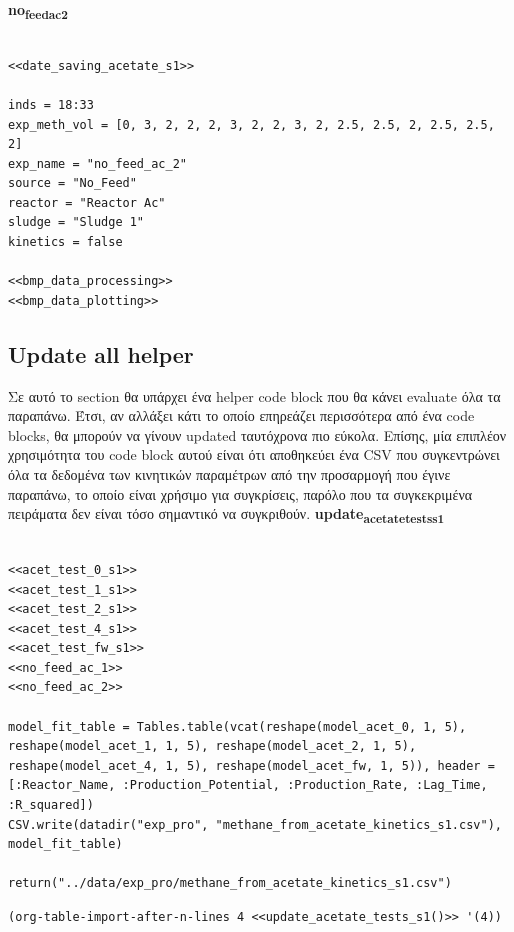 \documentclass[11pt]{article}
\begin{document}
\textbf{no\textsubscript{feed}\textsubscript{ac}\textsubscript{2}}
\begin{verbatim}

<<date_saving_acetate_s1>>

inds = 18:33
exp_meth_vol = [0, 3, 2, 2, 2, 3, 2, 2, 3, 2, 2.5, 2.5, 2, 2.5, 2.5, 2]
exp_name = "no_feed_ac_2"
source = "No_Feed"
reactor = "Reactor Ac"
sludge = "Sludge 1"
kinetics = false

<<bmp_data_processing>>
<<bmp_data_plotting>>
\end{verbatim}

\subsection{Update all helper}
\label{sec:orgf0967ed}
Σε αυτό το section θα υπάρχει ένα helper code block που θα κάνει evaluate όλα τα παραπάνω. Έτσι, αν αλλάξει κάτι το οποίο επηρεάζει περισσότερα από ένα code blocks, θα μπορούν να γίνουν updated ταυτόχρονα πιο εύκολα. Επίσης, μία επιπλέον χρησιμότητα του code block αυτού είναι ότι αποθηκεύει ένα CSV που συγκεντρώνει όλα τα δεδομένα των κινητικών παραμέτρων από την προσαρμογή που έγινε παραπάνω, το οποίο είναι χρήσιμο για συγκρίσεις, παρόλο που τα συγκεκριμένα πειράματα δεν είναι τόσο σημαντικό να συγκριθούν.
\textbf{update\textsubscript{acetate}\textsubscript{tests}\textsubscript{s1}}
\begin{verbatim}

<<acet_test_0_s1>>
<<acet_test_1_s1>>
<<acet_test_2_s1>>
<<acet_test_4_s1>>
<<acet_test_fw_s1>>
<<no_feed_ac_1>>
<<no_feed_ac_2>>

model_fit_table = Tables.table(vcat(reshape(model_acet_0, 1, 5), reshape(model_acet_1, 1, 5), reshape(model_acet_2, 1, 5), reshape(model_acet_4, 1, 5), reshape(model_acet_fw, 1, 5)), header = [:Reactor_Name, :Production_Potential, :Production_Rate, :Lag_Time, :R_squared])
CSV.write(datadir("exp_pro", "methane_from_acetate_kinetics_s1.csv"), model_fit_table)

return("../data/exp_pro/methane_from_acetate_kinetics_s1.csv")
\end{verbatim}

\begin{verbatim}
(org-table-import-after-n-lines 4 <<update_acetate_tests_s1()>> '(4))
\end{verbatim}
\end{document}

